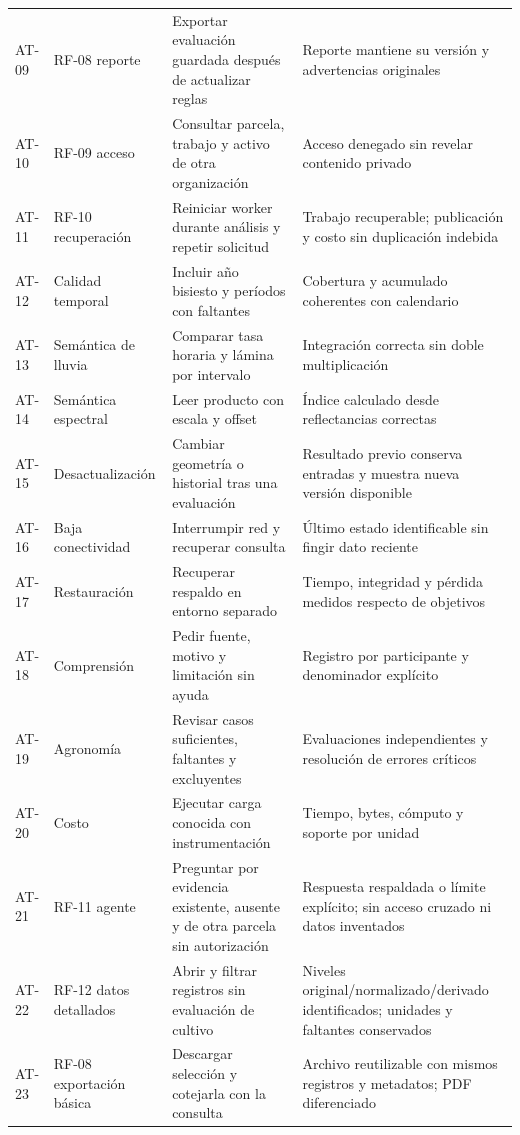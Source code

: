 \documentclass[10pt,a4paper]{article}
\begin{document}
\begin{longtable}{>{\raggedright\arraybackslash}p{3.115cm}>{\raggedright\arraybackslash}p{3.582cm}>{\raggedright\arraybackslash}p{4.517cm}>{\raggedright\arraybackslash}p{4.361cm}}
AT-09 & RF-08 reporte & Exportar evaluación guardada después de actualizar reglas & Reporte mantiene su versión y advertencias originales \\[3pt]
AT-10 & RF-09 acceso & Consultar parcela, trabajo y activo de otra organización & Acceso denegado sin revelar contenido privado \\[3pt]
AT-11 & RF-10 recuperación & Reiniciar worker durante análisis y repetir solicitud & Trabajo recuperable; publicación y costo sin duplicación indebida \\[3pt]
AT-12 & Calidad temporal & Incluir año bisiesto y períodos con faltantes & Cobertura y acumulado coherentes con calendario \\[3pt]
AT-13 & Semántica de lluvia & Comparar tasa horaria y lámina por intervalo & Integración correcta sin doble multiplicación \\[3pt]
AT-14 & Semántica espectral & Leer producto con escala y offset & Índice calculado desde reflectancias correctas \\[3pt]
AT-15 & Desactualización & Cambiar geometría o historial tras una evaluación & Resultado previo conserva entradas y muestra nueva versión disponible \\[3pt]
AT-16 & Baja conectividad & Interrumpir red y recuperar consulta & Último estado identificable sin fingir dato reciente \\[3pt]
AT-17 & Restauración & Recuperar respaldo en entorno separado & Tiempo, integridad y pérdida medidos respecto de objetivos \\[3pt]
AT-18 & Comprensión & Pedir fuente, motivo y limitación sin ayuda & Registro por participante y denominador explícito \\[3pt]
AT-19 & Agronomía & Revisar casos suficientes, faltantes y excluyentes & Evaluaciones independientes y resolución de errores críticos \\[3pt]
AT-20 & Costo & Ejecutar carga conocida con instrumentación & Tiempo, bytes, cómputo y soporte por unidad \\[3pt]
AT-21 & RF-11 agente & Preguntar por evidencia existente, ausente y de otra parcela sin autorización & Respuesta respaldada o límite explícito; sin acceso cruzado ni datos inventados \\[3pt]
AT-22 & RF-12 datos detallados & Abrir y filtrar registros sin evaluación de cultivo & Niveles original/\allowbreak{}normalizado/\allowbreak{}derivado identificados; unidades y faltantes conservados \\[3pt]
AT-23 & RF-08 exportación básica & Descargar selección y cotejarla con la consulta & Archivo reutilizable con mismos registros y metadatos; PDF diferenciado \\[3pt]
\end{longtable}
\endgroup
\end{document}
